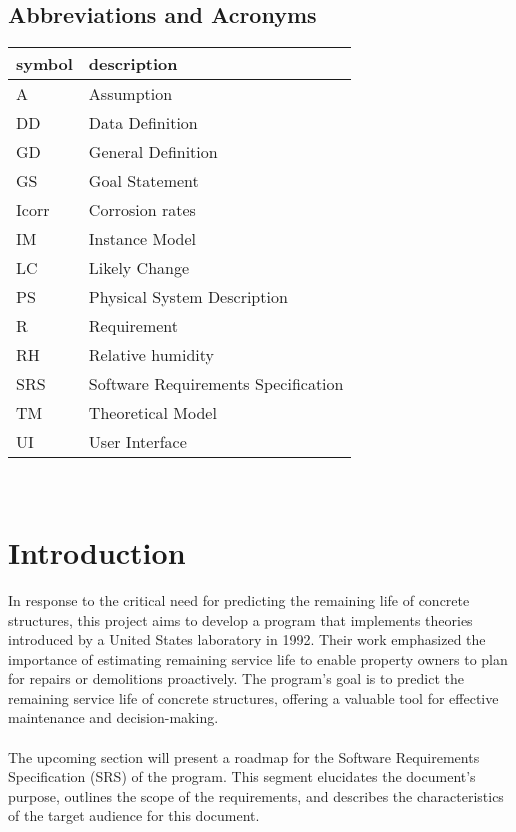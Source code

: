 \documentclass[12pt]{article}
\begin{document}
\subsection{Abbreviations and Acronyms}

\renewcommand{\arraystretch}{1.2}
\begin{tabular}{l l} 
  \toprule		
  \textbf{symbol} & \textbf{description}\\
  \midrule 
  A & Assumption\\
  DD & Data Definition\\
  GD & General Definition\\
  GS & Goal Statement\\
  Icorr & Corrosion rates\\
  IM & Instance Model\\
  LC & Likely Change\\
  PS & Physical System Description\\
  R & Requirement\\
  RH & Relative humidity \\
  SRS & Software Requirements Specification\\
  TM & Theoretical Model\\
  UI & User Interface \\
  \bottomrule
\end{tabular}\\



\section{Introduction}
In response to the critical need for predicting the remaining life of concrete structures, this project aims to develop a program that implements theories introduced by a United States laboratory in 1992. Their work emphasized the importance of estimating remaining service life to enable property owners to plan for repairs or demolitions proactively. The program's goal is to predict the remaining service life of concrete structures, offering a valuable tool for effective maintenance and decision-making. \\
\\
The upcoming section will present a roadmap for the Software Requirements Specification (SRS) of the program. This segment elucidates the document's purpose, outlines the scope of the requirements, and describes the characteristics of the target audience for this document.
\end{document}
